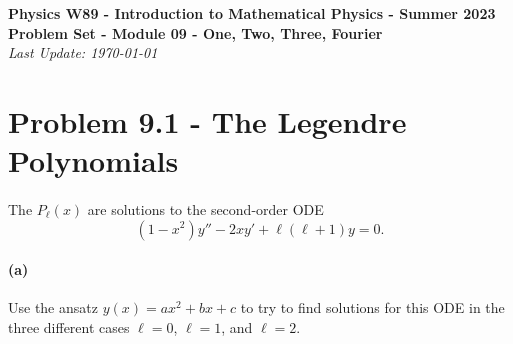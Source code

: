 \documentclass{article}
\begin{document}
\addcopyright
\begin{center}
{\bf \large Physics W89 - Introduction to Mathematical Physics - Summer 2023}\\\medskip
{\bf \large Problem Set - Module 09 - One, Two, Three, Fourier} \\\medskip
{\emph{Last Update: \today}}
\end{center}

\dphline\bigskip
\section*{Problem 9.1 - The Legendre Polynomials}

\paragraph{}
The  $P_{\ell}(x)$ are solutions to the second-order ODE
	\begin{equation}
		(1-x^{2})y'' - 2xy' + \ell(\ell+1)y = 0.
	\label{ODEtoP}
	\end{equation}

\paragraph{(a)}
Use the ansatz $y(x) = ax^{2}+bx+c$ to try to find solutions for this ODE in the three different cases $\ell = 0$, $\ell=1$, and $\ell=2$.\\
\end{document}
